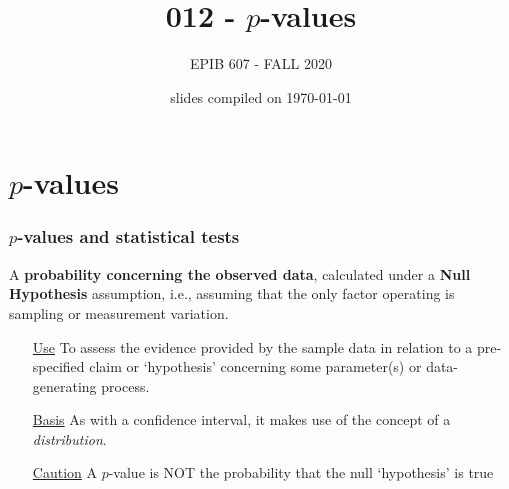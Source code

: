 \documentclass[10pt]{beamer}\usepackage[]{graphicx}\usepackage[]{color}
\begin{document}
	


	\title{012 - $p$-values}
\author{EPIB 607 - FALL 2020}

\date{slides compiled on \today}

\maketitle

\section{$p$-values}
\begin{frame}
	\frametitle{$p$-values and statistical tests}
	
	
	\begin{defm}[$p$-value]
		A \textbf{probability concerning the observed data}, calculated under a \textbf{Null Hypothesis} assumption, i.e., assuming that the only factor operating is sampling or measurement variation. 
	\end{defm}
	
	\begin{itemize} 
		\item[\underline{Use}] To assess the evidence provided by the sample data
		in relation to a pre-specified claim or `hypothesis' concerning some parameter(s) or data-generating process. 
		\item[\underline{Basis}] As with a confidence interval, it makes use of the concept of a \textit{distribution}. 
		\item[\underline{Caution}] A $p$-value is NOT the probability that the null `hypothesis' is true
	\end{itemize}
\end{frame}
\end{document}
